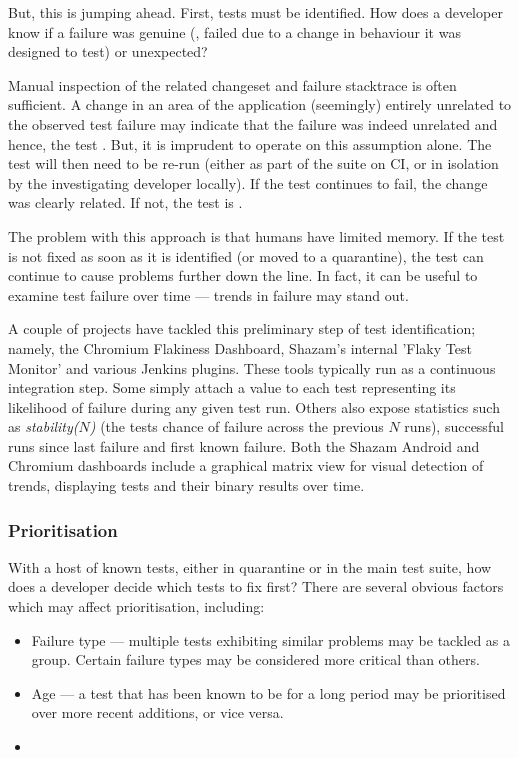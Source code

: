 But, this is jumping ahead. First, \flaky tests must be identified. How does a developer know if a failure was genuine (\ie, failed due to a change in behaviour it was designed to test) or unexpected?

Manual inspection of the related changeset and failure stacktrace is often sufficient. A change in an area of the application (seemingly) entirely unrelated to the observed test failure may indicate that the failure was indeed unrelated and hence, the test \flaky. But, it is imprudent to operate on this assumption alone. The test will then need to be re-run (either as part of the suite on CI, or in isolation by the investigating developer locally). If the test continues to fail, the change was clearly related. If not, the test is \flaky.

The problem with this approach is that humans have limited memory. If the \flaky test is not fixed as soon as it is identified (or moved to a quarantine), the test can continue to cause problems further down the line. In fact, it can be useful to examine test failure over time --- trends in failure may stand out.

A couple of projects have tackled this preliminary step of \flaky test identification; namely, the Chromium Flakiness Dashboard\cite{flakinessDashboard}, Shazam’s internal 'Flaky Test Monitor' and various Jenkins plugins. These tools typically run as a continuous integration step. Some simply attach a value to each test representing its likelihood of failure during any given test run. Others also expose statistics such as \emph{stability($N$)} (the tests chance of failure across the previous $N$ runs), successful runs since last failure and first known failure. Both the Shazam Android and Chromium dashboards include a graphical matrix view for visual detection of trends, displaying tests and their binary results over time.

\subsubsection{Prioritisation}

With a host of known \flaky tests, either in quarantine or in the main test suite, how does a developer decide which tests to fix first? There are several obvious factors which may affect prioritisation, including:
\begin{itemize}
	\item Failure type --- multiple \flaky tests exhibiting similar problems may be tackled as a group. Certain failure types may be considered more critical than others.
	\item Age --- a \flaky test that has been known to be \flaky for a long period may be prioritised over more recent additions, or vice versa.
	\item {}
\end{itemize}

